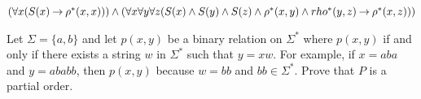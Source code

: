 \documentclass[addpoints]{exam}
\begin{document}
\begin{questions}
\begin{solution}
$(\forall x (S(x) \mathbin{\rightarrow} \rho^*(x,x))) \land (\forall x\forall y \forall z (S(x)
      \land S(y) \land S(z) \land \rho^*(x,y) \land rho^*(y,z) \mathbin{\rightarrow} \rho^*(x,z)))$
\end{solution}
\vspace{5mm}


\bonusquestion[4] 
Let $\Sigma = \{a,b\}$ and let $p(x,y)$ be a binary relation on $\Sigma^*$ 
where $p(x,y)$ if and only if there exists a string $w$ in $\Sigma^*$ such that $y = xw$.
For example, if $x = aba$ and $y = ababb$, then $p(x,y)$ because $w = bb$
and $bb \in \Sigma^*$.  Prove that $P$ is a partial order.
\vspace{30mm}







%
%
%
%
%



\end{questions}
\end{document}
